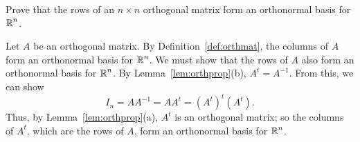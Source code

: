 \documentclass{ximera}
\begin{document}
\begin{exercise}  \label{c7.9.45}
Prove that the rows of an $n\times n$ orthogonal matrix form an orthonormal
basis for $\mbox{$\Bbb{R}$}^n$.

\begin{solution}

Let $A$ be an orthogonal matrix.  By
Definition~\ref{def:orthmat}, the columns of $A$ form an orthonormal
basis for $\mbox{$\Bbb{R}$}^n$.  We must show that the rows of $A$ also form an
orthonormal basis for $\mbox{$\Bbb{R}$}^n$.  By Lemma~\ref{lem:orthprop}(b), $A^t =
A^{-1}$.  From this, we can show
\[
I_n = AA^{-1} = AA^t = (A^t)^t(A^t).
\]
Thus, by Lemma~\ref{lem:orthprop}(a), $A^t$ is an orthogonal matrix;
so the columns of $A^t$, which are the rows of $A$, form an orthonormal
basis for $\mbox{$\Bbb{R}$}^n$.

\end{solution}
\end{exercise}
\end{document}
